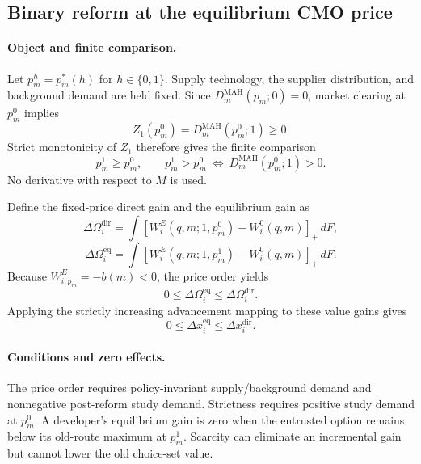 \subsection{Binary reform at the equilibrium CMO price}
\label{subsec:p15-equilibrium-policy}

\paragraph{Object and finite comparison.}
Let \(p_m^h=p_m^*(h)\) for \(h\in\{0,1\}\). Supply technology, the supplier
distribution, and background demand are held fixed. Since
\(D_m^{\mathrm{MAH}}(p_m;0)=0\), market clearing at \(p_m^0\) implies
\[
  Z_1(p_m^0)=D_m^{\mathrm{MAH}}(p_m^0;1)\geq0.
\]
Strict monotonicity of \(Z_1\) therefore gives the finite comparison
\begin{equation}
  p_m^1\geq p_m^0,
  \qquad
  p_m^1>p_m^0
  \ \Longleftrightarrow\
  D_m^{\mathrm{MAH}}(p_m^0;1)>0.
  \label{eq:p15-equilibrium-price-order}
\end{equation}
No derivative with respect to \(M\) is used.

Define the fixed-price direct gain and the equilibrium gain as
\[
  \Delta\Omega_i^{\mathrm{dir}}
  =
  \int[W_i^E(q,m;1,p_m^0)-W_i^0(q,m)]_+\,dF,
\]
\[
  \Delta\Omega_i^{\mathrm{eq}}
  =
  \int[W_i^E(q,m;1,p_m^1)-W_i^0(q,m)]_+\,dF.
\]
Because \(W_{i,p_m}^E=-b(m)<0\), the price order yields
\begin{equation}
  0\leq\Delta\Omega_i^{\mathrm{eq}}
  \leq\Delta\Omega_i^{\mathrm{dir}}.
  \label{eq:p15-value-attenuation}
\end{equation}
Applying the strictly increasing advancement mapping to these value gains
gives
\begin{equation}
  0\leq\Delta x_i^{\mathrm{eq}}
  \leq\Delta x_i^{\mathrm{dir}}.
  \label{eq:p15-advancement-attenuation}
\end{equation}

\paragraph{Conditions and zero effects.}
The price order requires policy-invariant supply/background demand and
nonnegative post-reform study demand. Strictness requires positive study
demand at \(p_m^0\). A developer's equilibrium gain is zero when the
entrusted option remains below its old-route maximum at \(p_m^1\). Scarcity
can eliminate an incremental gain but cannot lower the old choice-set value.

